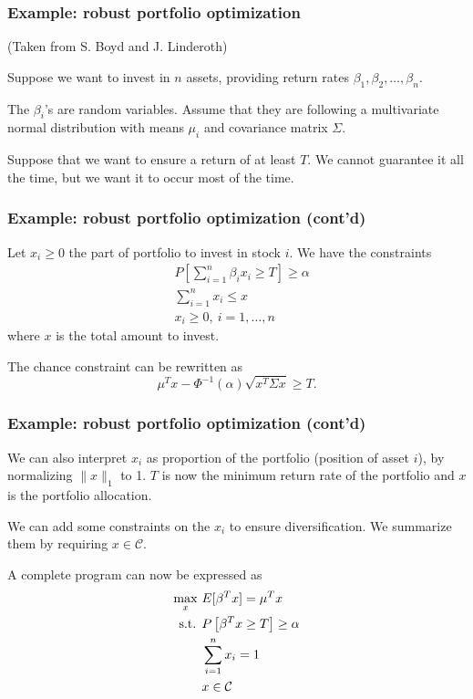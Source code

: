 \documentclass{beamer}
\begin{document}
\begin{frame}
\frametitle{Example: robust portfolio optimization}

(Taken from S. Boyd and J. Linderoth)

Suppose we want to invest in $n$ assets, providing return rates $\beta_1, \beta_2,\ldots, \beta_n$.

\mbox{}

The $\beta_i$'s are random variables.
Assume that they are following a multivariate normal distribution with means $\mu_i$ and covariance matrix $\Sigma$.

\mbox{}

Suppose that we want to ensure a return of at least $T$.
We cannot guarantee it all the time, but we want it to occur most of the time.

\end{frame}

\begin{frame}
\frametitle{Example: robust portfolio optimization (cont'd)}

Let $x_i \geq 0$ the part of portfolio to invest in stock $i$.
We have the constraints
\begin{align*}
& P\left[ \sum_{i = 1}^n \beta_i x_i \geq T  \right] \geq \alpha  \\
& \sum_{i = 1}^n x_i \leq x \\
& x_i \geq 0,\ i = 1,\ldots,n
\end{align*}
where $x$ is the total amount to invest.

\mbox{}

The chance constraint can be rewritten as
\[
\mu^Tx - \Phi^{-1}(\alpha) \sqrt{x^T\Sigma x} \geq T.
\]


\end{frame}

\begin{frame}
\frametitle{Example: robust portfolio optimization (cont'd)}

We can also interpret $x_i$ as proportion of the portfolio (position of asset $i$), by normalizing $\| x \|_1$ to 1.
$T$ is now the minimum return rate of the portfolio and $x$ is the portfolio allocation.

\mbox{}

We can add some constraints on the $x_i$ to ensure diversification. We summarize them by requiring $x \in \mathcal{C}$.

\mbox{}

A complete program can now be expressed as
\begin{align*}
\max_x \ & E[\beta^T x] = \mu^T x \\
\mbox{s.t. } & P\left[ \beta^T x \geq T \right] \geq \alpha  \\
& \sum_{i = 1}^n x_i = 1 \\
& x \in {\mathcal{C}}
\end{align*}

\end{frame}
\end{document}
